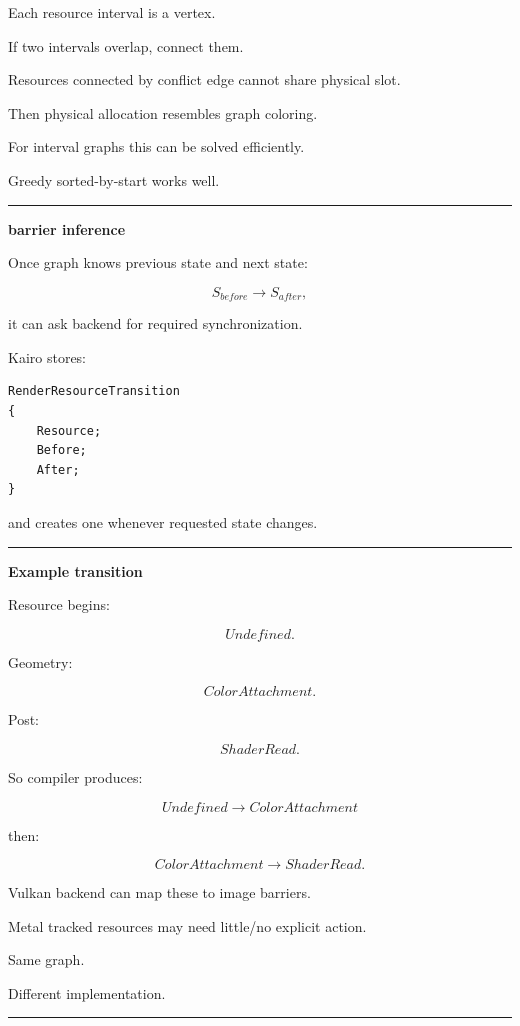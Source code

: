 Each resource interval is a vertex.

If two intervals overlap, connect them.

Resources connected by conflict edge cannot share physical slot.

Then physical allocation resembles graph coloring.

For interval graphs this can be solved efficiently.

Greedy sorted-by-start works well.

\begin{center}\rule{0.5\linewidth}{0.5pt}\end{center}

\textbf{barrier inference}

Once graph knows previous state and next state:

\[
S_{before}
\rightarrow
S_{after},
\]

it can ask backend for required synchronization.

Kairo stores:

\begin{verbatim}
RenderResourceTransition
{
    Resource;
    Before;
    After;
}
\end{verbatim}

and creates one whenever requested state changes.

\begin{center}\rule{0.5\linewidth}{0.5pt}\end{center}

\textbf{Example transition}

Resource begins:

\[
Undefined.
\]

Geometry:

\[
ColorAttachment.
\]

Post:

\[
ShaderRead.
\]

So compiler produces:

\[
Undefined
\rightarrow
ColorAttachment
\]

then:

\[
ColorAttachment
\rightarrow
ShaderRead.
\]

Vulkan backend can map these to image barriers.

Metal tracked resources may need little/no explicit action.

Same graph.

Different implementation.

\begin{center}\rule{0.5\linewidth}{0.5pt}\end{center}

